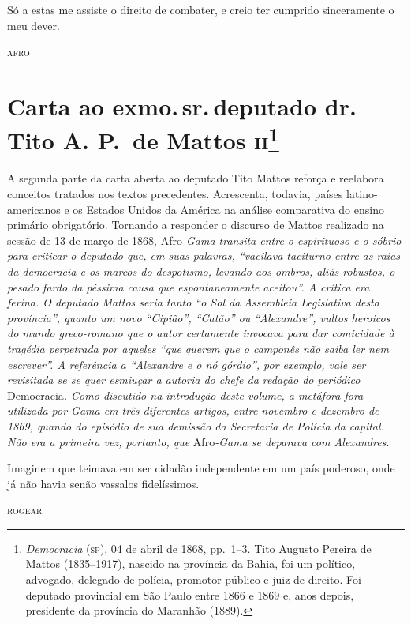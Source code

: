 Só a estas me assiste o direito de combater, e creio ter cumprido
sinceramente o meu dever.

\begin{flushright}
\textsc{afro}
\end{flushright}

\chapter{Carta ao exmo.\,sr.\,deputado dr.\,Tito A. P.~de Mattos
\textsc{ii}\footnote{\emph{Democracia} (\textsc{sp}), 04 de abril de 1868, pp.~1--3.
  Tito Augusto Pereira de Mattos (1835--1917), nascido na província da
  Bahia, foi um político, advogado, delegado de polícia, promotor
  público e juiz de direito. Foi deputado provincial em São Paulo entre
  1866 e 1869 e, anos depois, presidente da província do Maranhão
  (1889).}}

\begin{didascalia}
A segunda parte da carta aberta ao deputado Tito Mattos reforça e
reelabora conceitos tratados nos textos precedentes. Acrescenta,
todavia, países latino-americanos e os Estados Unidos da América na
análise comparativa do ensino primário obrigatório. Tornando a responder
o discurso de Mattos realizado na sessão de 13 de março de 1868, Afro\emph{-Gama
transita entre o espirituoso e o sóbrio para criticar o deputado que, em
suas palavras, ``vacilava taciturno entre as raias da democracia e
os marcos do despotismo, levando aos ombros, aliás robustos, o pesado
fardo da péssima causa que espontaneamente aceitou''. A crítica era
ferina. O deputado Mattos seria tanto ``o Sol da Assembleia Legislativa
desta província'', quanto um novo ``Cipião'', ``Catão'' ou ``Alexandre'',
vultos heroicos do mundo greco-romano que o autor certamente invocava
para dar comicidade à tragédia perpetrada por aqueles ``que querem que o
camponês não saiba ler nem escrever''. A referência a ``Alexandre e o nó
górdio'', por exemplo, vale ser revisitada se se quer esmiuçar a autoria
do chefe da redação do periódico} Democracia\emph{. Como discutido na
introdução deste volume, a metáfora fora utilizada por Gama em três
diferentes artigos, entre novembro e dezembro de 1869, quando do
episódio de sua demissão da Secretaria de Polícia da capital. Não era a
primeira vez, portanto, que} Afro\emph{-Gama se deparava com
Alexandres.}
\end{didascalia}



\epigraph{Imaginem que teimava em ser cidadão independente em um país poderoso,
onde já não havia senão vassalos fidelíssimos.}{\textsc{rogear}\footnotemark}

